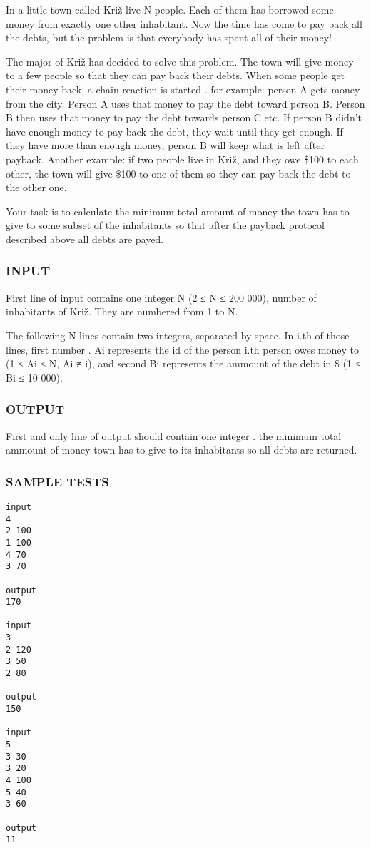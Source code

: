 



   In a little town called Križ live N people. Each of them has borrowed some money from exactly one other inhabitant. Now the time has come to pay back all the debts, but the problem is that everybody  has spent all of their money!  

   The major of Križ has decided to solve this problem. The town will give money to a few people so that  they can pay back their debts. When some people get their money back, a chain reaction is started . for  example: person A gets money from the city. Person A uses that money to pay the debt toward person  B. Person B then uses that money to pay the debt towards person C etc. If person B didn’t have  enough money to pay back the debt, they wait until  they get enough. If they have more than enough  money, person B will keep what is left after payback.   Another example: if two people live in Križ, and they owe \$100 to each other, the town will give \$100  to one of them so they can pay back the debt to the other one.  

   Your task is to calculate the minimum total amount of money the town has to give to some subset  of the inhabitants so that after the payback protocol described above all debts are payed.  

\subsubsection{   INPUT  }

   First line of input contains one integer N (2 ≤ N ≤ 200 000), number of inhabitants of Križ. They are numbered from 1 to N.  

   The following N lines contain two integers, separated by space. In i.th of those lines, first number . Ai represents the id of the person  i.th person owes money to (1 ≤  Ai  ≤ N,  Ai  ≠  i), and second  Bi represents the ammount of the debt in \$ (1 ≤ Bi  ≤ 10 000).  

\subsubsection{   OUTPUT  }

   First and only line of output should contain one integer . the minimum total ammount of money town  has to give to its inhabitants so all debts are returned.  

\subsubsection{   SAMPLE TESTS  }
\begin{verbatim}
input
4
2 100 
1 100 
4 70 
3 70 

output
170 

input
3 
2 120 
3 50 
2 80

output
150

input
5 
3 30 
3 20 
4 100 
5 40 
3 60 

output
11
\end{verbatim}